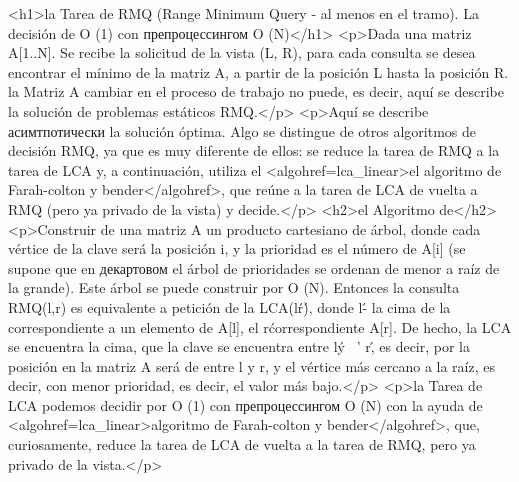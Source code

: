 <h1>la Tarea de RMQ (Range Minimum Query - al menos en el tramo). La decisión de O (1) con препроцессингом O (N)</h1>
<p>Dada una matriz A[1..N]. Se recibe la solicitud de la vista (L, R), para cada consulta se desea encontrar el mínimo de la matriz A, a partir de la posición L hasta la posición R. la Matriz A cambiar en el proceso de trabajo no puede, es decir, aquí se describe la solución de problemas estáticos RMQ.</p>
<p>Aquí se describe асимтпотически la solución óptima. Algo se distingue de otros algoritmos de decisión RMQ, ya que es muy diferente de ellos: se reduce la tarea de RMQ a la tarea de LCA y, a continuación, utiliza el <algohref=lca_linear>el algoritmo de Farah-colton y bender</algohref>, que reúne a la tarea de LCA de vuelta a RMQ (pero ya privado de la vista) y decide.</p>
<h2>el Algoritmo de</h2>
<p>Construir de una matriz A un producto cartesiano de árbol, donde cada vértice de la clave será la posición i, y la prioridad es el número de A[i] (se supone que en декартовом el árbol de prioridades se ordenan de menor a raíz de la grande). Este árbol se puede construir por O (N). Entonces la consulta RMQ(l,r) es equivalente a petición de la LCA(l\'r\'), donde l\' - la cima de la correspondiente a un elemento de A[l], el r\' correspondiente A[r]. De hecho, la LCA se encuentra la cima, que la clave se encuentra entre l\' y \ ' r\', es decir, por la posición en la matriz A será de entre l y r, y el vértice más cercano a la raíz, es decir, con menor prioridad, es decir, el valor más bajo.</p>
<p>la Tarea de LCA podemos decidir por O (1) con препроцессингом O (N) con la ayuda de <algohref=lca_linear>algoritmo de Farah-colton y bender</algohref>, que, curiosamente, reduce la tarea de LCA de vuelta a la tarea de RMQ, pero ya privado de la vista.</p>